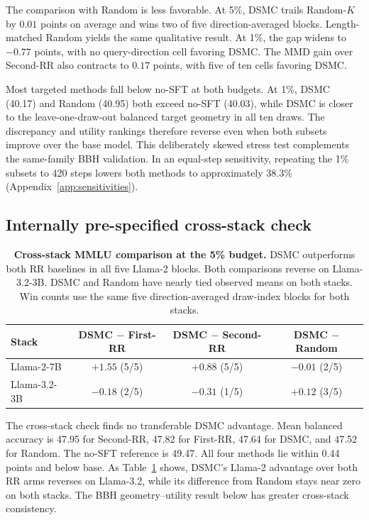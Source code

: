 \documentclass{article}
\newcommand{\method}{\textsc{DSMC}}
\begin{document}
The comparison with Random is less favorable. At 5\%, \method{} trails
Random-$K$ by
$0.01$ points on average and wins two of five direction-averaged blocks.
Length-matched Random yields the same qualitative result. At 1\%, the gap
widens to $-0.77$ points, with no query-direction cell favoring \method{}.
The MMD gain over Second-RR also contracts to $0.17$ points, with five of ten
cells favoring \method{}.

Most targeted methods fall below no-SFT at both budgets. At 1\%,
\method{} (40.17) and Random (40.95) both exceed no-SFT (40.03), while
\method{} is closer to the leave-one-draw-out balanced target geometry in all
ten draws. The discrepancy and utility rankings therefore reverse even when
both subsets improve over the base model. This deliberately skewed stress test
complements the same-family BBH validation. In an equal-step sensitivity,
repeating the 1\% subsets to 420 steps lowers both methods to approximately
38.3\% (Appendix~\ref{app:sensitivities}).

\subsection{Internally pre-specified cross-stack check}

\begin{table}[t]
\caption{\textbf{Cross-stack MMLU comparison at the 5\% budget.}
\method{} outperforms both RR baselines in all five Llama-2 blocks. Both
comparisons reverse on Llama-3.2-3B. \method{} and Random have nearly tied
observed means on both stacks. Win counts use the same five
direction-averaged draw-index blocks for both stacks.}
\label{tab:mmlu_crossstack}
\centering
\small
\begin{tabular}{lccc}
\toprule
Stack & \method{} $-$ First-RR & \method{} $-$ Second-RR
& \method{} $-$ Random \\
\midrule
Llama-2-7B & $+1.55$ (5/5) & $+0.88$ (5/5) & $-0.01$ (2/5) \\
Llama-3.2-3B & $-0.18$ (2/5) & $-0.31$ (1/5) & $+0.12$ (3/5) \\
\bottomrule
\end{tabular}
\end{table}

The cross-stack check finds no transferable \method{} advantage. Mean balanced
accuracy is 47.95 for Second-RR, 47.82 for First-RR, 47.64 for \method{}, and
47.52 for Random. The no-SFT reference is 49.47. All four methods lie within
0.44 points and below base. As Table~\ref{tab:mmlu_crossstack} shows,
\method{}'s Llama-2 advantage over both RR arms reverses on Llama-3.2, while
its difference from Random stays near zero on both stacks.
The BBH geometry--utility result below has greater cross-stack consistency.
\end{document}
